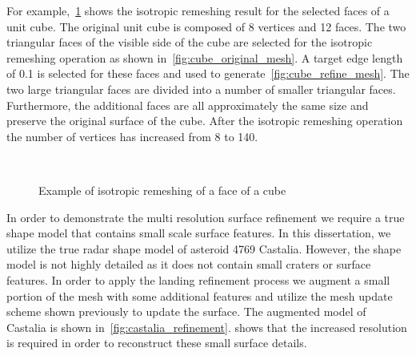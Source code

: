 \documentclass[journal]{new-aiaa}
\begin{document}
For example,~\cref{fig:cube_remesh} shows the isotropic remeshing result for the selected faces of a unit cube.
The original unit cube is composed of \num{8} vertices and \num{12} faces.
The two triangular faces of the visible side of the cube are selected for the isotropic remeshing operation as shown in~\cref{fig:cube_original_mesh}.
A target edge length of \num{0.1} is selected for these faces and used to generate~\cref{fig:cube_refine_mesh}.
The two large triangular faces are divided into a number of smaller triangular faces.
Furthermore, the additional faces are all approximately the same size and preserve the original surface of the cube.
After the isotropic remeshing operation the number of vertices has increased from \num{8} to \num{140}.
\begin{figure}[htbp]
    \centering
    ~
    \caption{Example of isotropic remeshing of a face of a cube\label{fig:cube_remesh}}
\end{figure}

In order to demonstrate the multi resolution surface refinement we require a true shape model that contains small scale surface features.
In this dissertation, we utilize the true radar shape model of asteroid 4769 Castalia.
However, the shape model is not highly detailed as it does not contain small craters or surface features.
In order to apply the landing refinement process we augment a small portion of the mesh with some additional features and utilize the mesh update scheme shown previously to update the surface.
The augmented model of Castalia is shown in~\cref{fig:castalia_refinement}.
 shows that the increased resolution is required in order to reconstruct these small surface details.
\end{document}
